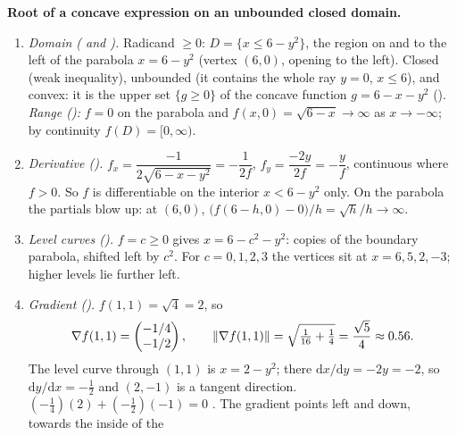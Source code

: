 \begin{solutions}
  \item \textbf{Root of a concave expression on an unbounded closed domain.}
        \begin{enumerate}[label=(\alph*),leftmargin=1.8em,itemsep=0.4ex]
          \item \emph{Domain ( and ).} Radicand
                $\ge0$: $D=\{x\le6-y^{2}\}$, the region on and to the left of
                the parabola $x=6-y^{2}$ (vertex $(6,0)$, opening to the
                left). Closed (weak inequality), unbounded (it contains the
                whole ray $y=0$, $x\le6$), and convex: it is
                the upper set $\{g\ge0\}$ of the concave function
                $g=6-x-y^{2}$ (). \emph{Range
                ():} $f=0$ on the parabola and
                $f(x,0)=\sqrt{6-x}\to\infty$ as $x\to-\infty$; by
                continuity $f(D)=[0,\infty)$.
          \item \emph{Derivative ().}
                $f_{x}=\dfrac{-1}{2\sqrt{6-x-y^{2}}}=-\dfrac{1}{2f}$,
                \;$f_{y}=\dfrac{-2y}{2f}=-\dfrac{y}{f}$, continuous where
                $f>0$. So $f$ is differentiable on the interior
                $x<6-y^{2}$ only. On the parabola the partials blow up:
                at $(6,0)$, $\bigl(f(6-h,0)-0\bigr)/h=\sqrt h/h\to\infty$.
          \item \emph{Level curves ().} $f=c\ge0$ gives
                $x=6-c^{2}-y^{2}$: copies of the boundary parabola, shifted
                left by $c^{2}$. For $c=0,1,2,3$ the vertices sit at
                $x=6,5,2,-3$; higher levels lie further left.
          \item \emph{Gradient ().} $f(1,1)=\sqrt4=2$, so
                \[
                  \nabla f(1,1)=\begin{pmatrix}-1/4\\-1/2\end{pmatrix},\qquad
                  \lVert\nabla f(1,1)\rVert=\sqrt{\tfrac1{16}+\tfrac14}
                  =\frac{\sqrt5}{4}\approx0.56 .
                \]
                The level curve through $(1,1)$ is $x=2-y^{2}$; there
                $\mathrm{d}x/\mathrm{d}y=-2y=-2$, so
                $\mathrm{d}y/\mathrm{d}x=-\tfrac12$ and $(2,-1)$ is a tangent
                direction. $(-\tfrac14)(2)+(-\tfrac12)(-1)=0$ \checkmark.
                The gradient points left and down, towards the inside of the

\end{enumerate}
\end{solutions}

